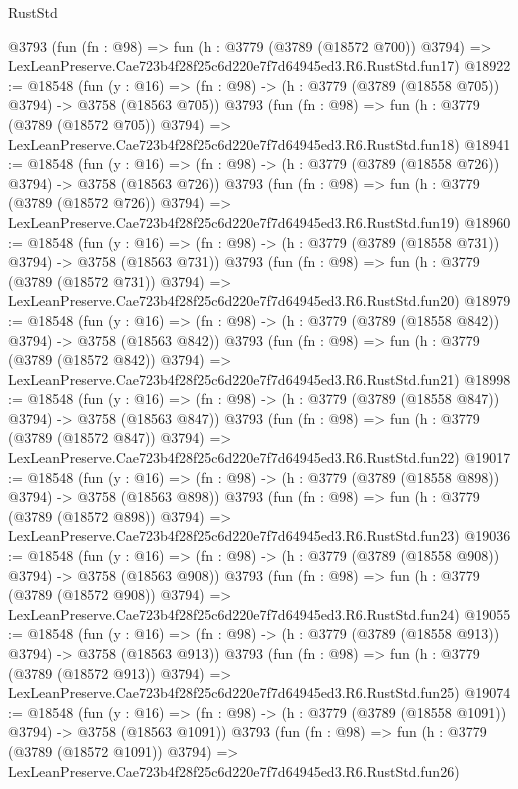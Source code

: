 \begin{lexlean}{RustStd}
\begin{coremodule}
    @3793
    (fun (fn : @98) =>
    fun (h : @3779 (@3789 (@18572 @700)) @3794) =>
    LexLeanPreserve.Cae723b4f28f25c6d220e7f7d64945ed3.R6.RustStd.fun17)
@18922 := @18548
    (fun (y : @16) => (fn : @98) -> (h : @3779 (@3789 (@18558 @705)) @3794) -> @3758 (@18563 @705))
    @3793
    (fun (fn : @98) =>
    fun (h : @3779 (@3789 (@18572 @705)) @3794) =>
    LexLeanPreserve.Cae723b4f28f25c6d220e7f7d64945ed3.R6.RustStd.fun18)
@18941 := @18548
    (fun (y : @16) => (fn : @98) -> (h : @3779 (@3789 (@18558 @726)) @3794) -> @3758 (@18563 @726))
    @3793
    (fun (fn : @98) =>
    fun (h : @3779 (@3789 (@18572 @726)) @3794) =>
    LexLeanPreserve.Cae723b4f28f25c6d220e7f7d64945ed3.R6.RustStd.fun19)
@18960 := @18548
    (fun (y : @16) => (fn : @98) -> (h : @3779 (@3789 (@18558 @731)) @3794) -> @3758 (@18563 @731))
    @3793
    (fun (fn : @98) =>
    fun (h : @3779 (@3789 (@18572 @731)) @3794) =>
    LexLeanPreserve.Cae723b4f28f25c6d220e7f7d64945ed3.R6.RustStd.fun20)
@18979 := @18548
    (fun (y : @16) => (fn : @98) -> (h : @3779 (@3789 (@18558 @842)) @3794) -> @3758 (@18563 @842))
    @3793
    (fun (fn : @98) =>
    fun (h : @3779 (@3789 (@18572 @842)) @3794) =>
    LexLeanPreserve.Cae723b4f28f25c6d220e7f7d64945ed3.R6.RustStd.fun21)
@18998 := @18548
    (fun (y : @16) => (fn : @98) -> (h : @3779 (@3789 (@18558 @847)) @3794) -> @3758 (@18563 @847))
    @3793
    (fun (fn : @98) =>
    fun (h : @3779 (@3789 (@18572 @847)) @3794) =>
    LexLeanPreserve.Cae723b4f28f25c6d220e7f7d64945ed3.R6.RustStd.fun22)
@19017 := @18548
    (fun (y : @16) => (fn : @98) -> (h : @3779 (@3789 (@18558 @898)) @3794) -> @3758 (@18563 @898))
    @3793
    (fun (fn : @98) =>
    fun (h : @3779 (@3789 (@18572 @898)) @3794) =>
    LexLeanPreserve.Cae723b4f28f25c6d220e7f7d64945ed3.R6.RustStd.fun23)
@19036 := @18548
    (fun (y : @16) => (fn : @98) -> (h : @3779 (@3789 (@18558 @908)) @3794) -> @3758 (@18563 @908))
    @3793
    (fun (fn : @98) =>
    fun (h : @3779 (@3789 (@18572 @908)) @3794) =>
    LexLeanPreserve.Cae723b4f28f25c6d220e7f7d64945ed3.R6.RustStd.fun24)
@19055 := @18548
    (fun (y : @16) => (fn : @98) -> (h : @3779 (@3789 (@18558 @913)) @3794) -> @3758 (@18563 @913))
    @3793
    (fun (fn : @98) =>
    fun (h : @3779 (@3789 (@18572 @913)) @3794) =>
    LexLeanPreserve.Cae723b4f28f25c6d220e7f7d64945ed3.R6.RustStd.fun25)
@19074 := @18548
    (fun (y : @16) =>
    (fn : @98) -> (h : @3779 (@3789 (@18558 @1091)) @3794) -> @3758 (@18563 @1091))
    @3793
    (fun (fn : @98) =>
    fun (h : @3779 (@3789 (@18572 @1091)) @3794) =>
    LexLeanPreserve.Cae723b4f28f25c6d220e7f7d64945ed3.R6.RustStd.fun26)

\end{coremodule}
\end{lexlean}
